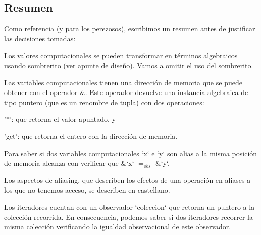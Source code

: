 \hypertarget{Aliasing_sec-Resumen}{}\subsection{\-Resumen}\label{Aliasing_sec-Resumen}
\-Como referencia (y para los perezosos), escribimos un resumen antes de justificar las decisiones tomadas\-:
\begin{DoxyItemize}
\item \-Los valores computacionales se pueden transformar en términos algebraicos usando sombrerito (ver apunte de diseño). \-Vamos a omitir el uso del sombrerito.
\item \-Las variables computacionales tienen una dirección de memoria que se puede obtener con el operador \&. \-Este operador devuelve una instancia algebraica de tipo puntero (que es un renombre de tupla) con dos operaciones\-:
\begin{DoxyEnumerate}
\item '$\ast$'\-: que retorna el valor apuntado, y
\item 'get'\-: que retorna el entero con la dirección de memoria.
\end{DoxyEnumerate}
\item \-Para saber si dos variables computacionales `x` e `y` son alias a la misma posición de memoria alcanza con verificar que \&`x` $=_{obs}$ \&`y`.
\item \-Los aspectos de aliasing, que describen los efectos de una operación en aliases a los que no tenemos acceso, se describen en castellano.
\item \-Los iteradores cuentan con un observador `coleccion` que retorna un puntero a la colección recorrida. \-En consecuencia, podemos saber si dos iteradores recorrer la misma colección verificando la igualdad observacional de este observador.
\end{DoxyItemize}

